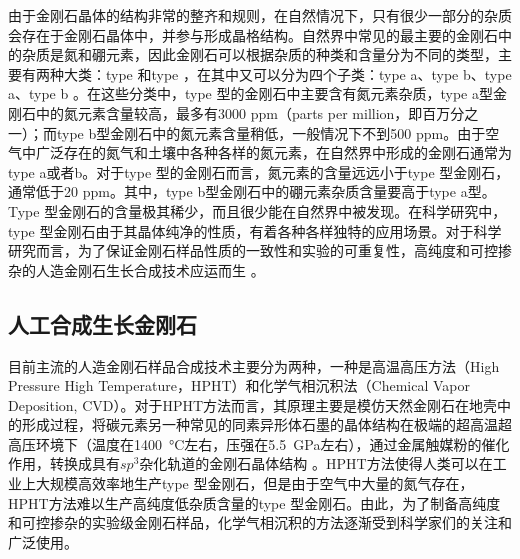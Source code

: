 \documentclass[type = bachelor]{whu-thesis}
\begin{document}
由于金刚石晶体的结构非常的整齐和规则，在自然情况下，只有很少一部分的杂质会存在于金刚石晶体中，并参与形成晶格结构。自然界中常见的最主要的金刚石中的杂质是氮和硼元素，因此金刚石可以根据杂质的种类和含量分为不同的类型，主要有两种大类：type \uppercase\expandafter{}和type \uppercase\expandafter{}，在其中又可以分为四个子类：type \uppercase\expandafter{}a、type \uppercase\expandafter{}b、type \uppercase\expandafter{}a、type \uppercase\expandafter{}b \cite{breeding2009type}。在这些分类中，type \uppercase\expandafter{}型的金刚石中主要含有氮元素杂质，type \uppercase\expandafter{}a型金刚石中的氮元素含量较高，最多有3000 ppm（parts per million，即百万分之一）；而type \uppercase\expandafter{}b型金刚石中的氮元素含量稍低，一般情况下不到500 ppm。由于空气中广泛存在的氮气和土壤中各种各样的氮元素，在自然界中形成的金刚石通常为type \uppercase\expandafter{}a或者\uppercase\expandafter{}b。对于type \uppercase\expandafter{}型的金刚石而言，氮元素的含量远远小于type \uppercase\expandafter{}型金刚石，通常低于20 ppm。其中，type \uppercase\expandafter{}b型金刚石中的硼元素杂质含量要高于type \uppercase\expandafter{}a型。Type \uppercase\expandafter{}型金刚石的含量极其稀少，而且很少能在自然界中被发现。在科学研究中，type \uppercase\expandafter{}型金刚石由于其晶体纯净的性质，有着各种各样独特的应用场景。对于科学研究而言，为了保证金刚石样品性质的一致性和实验的可重复性，高纯度和可控掺杂的人造金刚石生长合成技术应运而生 \cite{sumiya1997crystalline, spitsyn1981vapor, gracio2010diamond}。

\subsection{人工合成生长金刚石}
目前主流的人造金刚石样品合成技术主要分为两种，一种是高温高压方法（High Pressure High Temperature，HPHT）和化学气相沉积法（Chemical Vapor Deposition, CVD）。对于HPHT方法而言，其原理主要是模仿天然金刚石在地壳中的形成过程，将碳元素另一种常见的同素异形体石墨的晶体结构在极端的超高温超高压环境下（温度在\SI{1400}{\degreeCelsius}左右，压强在\SI{5.5}{\GPa}左右），通过金属触媒粉的催化作用，转换成具有$sp^3$杂化轨道的金刚石晶体结构 \cite{dossa2023analysis}。HPHT方法使得人类可以在工业上大规模高效率地生产type \uppercase\expandafter{}型金刚石，但是由于空气中大量的氮气存在，HPHT方法难以生产高纯度低杂质含量的type \uppercase\expandafter{}型金刚石。由此，为了制备高纯度和可控掺杂的实验级金刚石样品，化学气相沉积的方法逐渐受到科学家们的关注和广泛使用。
\end{document}
